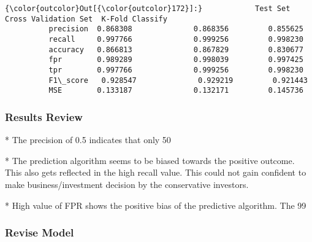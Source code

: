 \documentclass[11pt]{article}
\begin{document}
\begin{Verbatim}[commandchars=\\\{\}]
{\color{outcolor}Out[{\color{outcolor}172}]:}            Test Set  Cross Validation Set  K-Fold Classify
          precision  0.868308              0.868356         0.855625
          recall     0.997766              0.999256         0.998230
          accuracy   0.866813              0.867829         0.830677
          fpr        0.989289              0.998039         0.997425
          tpr        0.997766              0.999256         0.998230
          F1\_score   0.928547              0.929219         0.921443
          MSE        0.133187              0.132171         0.145736
\end{Verbatim}
            
    \subsubsection{Results Review}\label{results-review}
* The precision of 0.5 indicates that only 50%

* The prediction algorithm seems to be biased towards the positive outcome. This also gets reflected in the high recall value. This could not gain confident to make business/investment decision by the conservative investors.

* High value of FPR shows the positive bias of the predictive algorithm. The 99%
    \subsubsection{Revise Model}\label{revise-model}
\end{document}
